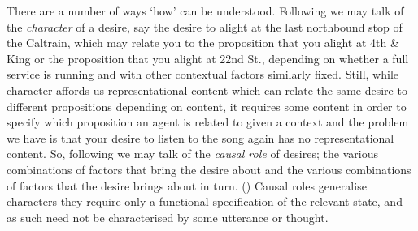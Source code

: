 \documentclass[10pt]{article}
\begin{document}
There are a number of ways `how' can be understood.
Following \citeauthor{Kaplan:1989ab} we may talk of the \emph{character} of a desire, say the desire to alight at the last northbound stop of the Caltrain, which may relate you to the proposition that you alight at 4th \& King or the proposition that you alight at 22nd St., depending on whether a full service is running and with other contextual factors similarly fixed.
Still, while character affords us representational content which can relate the same desire to different propositions depending on content, it requires some content in order to specify which proposition an agent is related to given a context and the problem we have is that your desire to listen to the song again has no representational content.
So, following \citeauthor{Perry:1997aa} we may talk of the \emph{causal role} of desires; the various combinations of factors that bring the desire about and the various combinations of factors that the desire brings about in turn. (\citeyear[360--361]{Perry:1997aa})
Causal roles generalise characters they require only a functional specification of the relevant state, and as such need not be characterised by some utterance or thought.
\end{document}
